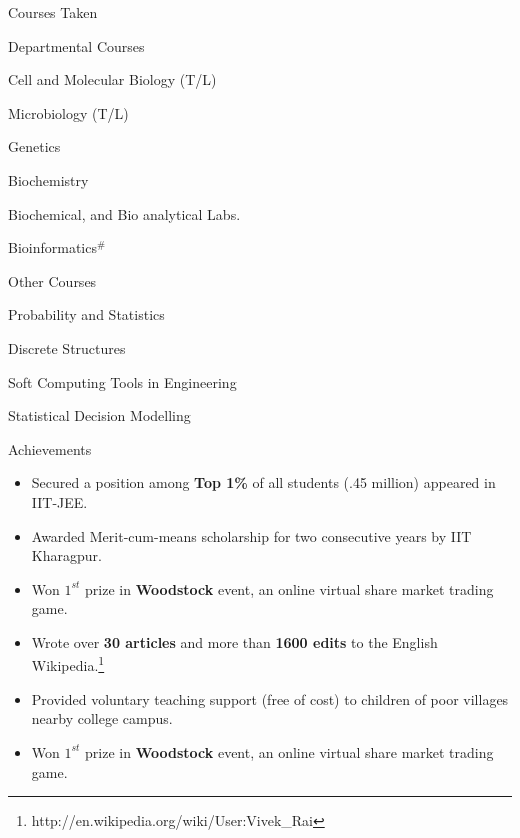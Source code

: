 \documentclass{article}
\newlength{\tabin}
\newlength{\secsep}
\newcommand{\lineunder}{\vspace*{-8pt} \\ \hspace*{-6pt} \hrulefill \\ \vspace*{-15pt}}
\newenvironment{tabbedsection}[1]{
  \begin{list}{}{
      \setlength{\itemsep}{0pt}
      \setlength{\labelsep}{0pt}
      \setlength{\labelwidth}{0pt}
      \setlength{\leftmargin}{\tabin}
      \setlength{\rightmargin}{\tabin}
      \setlength{\listparindent}{0pt}
      \setlength{\parsep}{0pt}
      \setlength{\parskip}{0pt}
      \setlength{\partopsep}{0pt}
      \setlength{\topsep}{#1}
    }
  \item[]
}{\end{list}}
\newenvironment{resume_section}[1]{
  \filbreak
  \vspace{2\secsep}
  \textsc{\large#1}
  \lineunder
  \begin{tabbedsection}{\secsep}
}{\end{tabbedsection}}
\newenvironment{resume_subsection}[2][]{
  \textbf{#2} \hfill {\footnotesize #1} \hspace{1.0em}
  \begin{tabbedsection}{0.5\secsep}
}{\end{tabbedsection}}
\newenvironment{subitems}{
  \renewcommand{\labelitemi}{-}
  \begin{itemize}
      \setlength{\labelsep}{1em}
}{\end{itemize}}
\begin{document}
\begin{resume_section}{Courses Taken}
\begin{resume_subsection}{Departmental Courses}
    \begin{subitems}
        \begin{multicols}{2}
        \item Cell and Molecular Biology (T/L)
        \item Microbiology (T/L)
        \item Genetics
        \item Biochemistry
        \item Biochemical, and Bio analytical Labs.
        \item Bioinformatics$^{\#}$
        \end{multicols}
    \end{subitems}
\end{resume_subsection}
\begin{resume_subsection}[]{Other Courses}
    \begin{subitems}
        \begin{multicols}{2}
        \item Probability and Statistics
        \item Discrete Structures
        \item Soft Computing Tools in Engineering
        \item Statistical Decision Modelling
        \end{multicols}
    \end{subitems}
\end{resume_subsection}
\end{resume_section}

\begin{resume_section}{Achievements}
    \begin{subitems}
      \item Secured a position among \textbf{Top 1\%} of all students (.45 million) appeared in IIT-JEE.
      \item Awarded Merit-cum-means scholarship for two consecutive years by IIT Kharagpur.
      \item Won ${1^{st}}$ prize in \textbf{Woodstock} event, an online virtual share market trading game.
      \item Wrote over \textbf{30 articles} and more than \textbf{1600 edits} to the English Wikipedia.\footnote{http://en.wikipedia.org/wiki/User:Vivek\_Rai}
      \item Provided voluntary teaching support (free of cost) to children of poor villages nearby college campus.
      \item Won ${1^{st}}$ prize in \textbf{Woodstock} event, an online virtual share market trading game.
    \end{subitems}
\end{resume_section}
\end{document}
